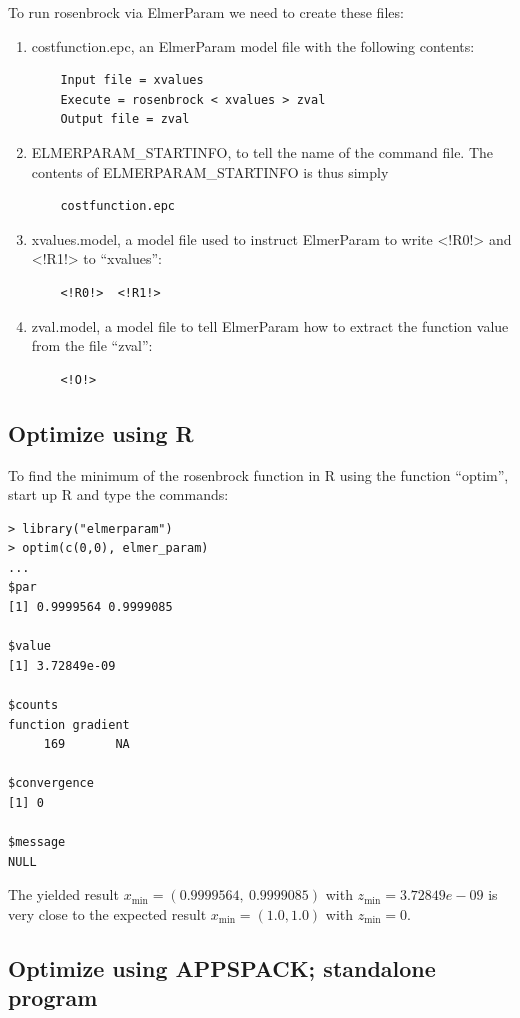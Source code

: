 \documentclass[12pt,a4paper]{article}
\begin{document}
To run rosenbrock via ElmerParam we need to create these files:
\begin{enumerate}
    \item costfunction.epc, an ElmerParam model file with
    the following contents:
    \begin{verbatim}
    Input file = xvalues
    Execute = rosenbrock < xvalues > zval
    Output file = zval
    \end{verbatim}

    \item ELMERPARAM\_STARTINFO, to tell the name of the command file.  The
    contents of ELMERPARAM\_STARTINFO is thus simply
    \begin{verbatim}
    costfunction.epc
    \end{verbatim}

    \item xvalues.model, a model file used to instruct
    ElmerParam to write <!R0!> and <!R1!> to ``xvalues'':
    \begin{verbatim}
    <!R0!>  <!R1!>
    \end{verbatim}

    \item zval.model, a model file to tell ElmerParam how to extract the
    function value from the file ``zval'':
    \begin{verbatim}
    <!O!>
    \end{verbatim}
\end{enumerate}


\subsection{Optimize using R}
To find the minimum of the rosenbrock function in R using the function
``optim'', start up R and type the commands:
\begin{verbatim}
> library("elmerparam")
> optim(c(0,0), elmer_param)
...
$par
[1] 0.9999564 0.9999085

$value
[1] 3.72849e-09

$counts
function gradient 
     169       NA 

$convergence
[1] 0

$message
NULL
\end{verbatim}
The yielded result $x_\mathrm{min} = (0.9999564,\ 0.9999085)$ with
$z_\mathrm{min} = 3.72849e-09$ is very close to the expected result
$x_\mathrm{min} = (1.0, 1.0)$ with $z_\mathrm{min} = 0$.


\subsection{Optimize using APPSPACK; standalone program}
\end{document}
